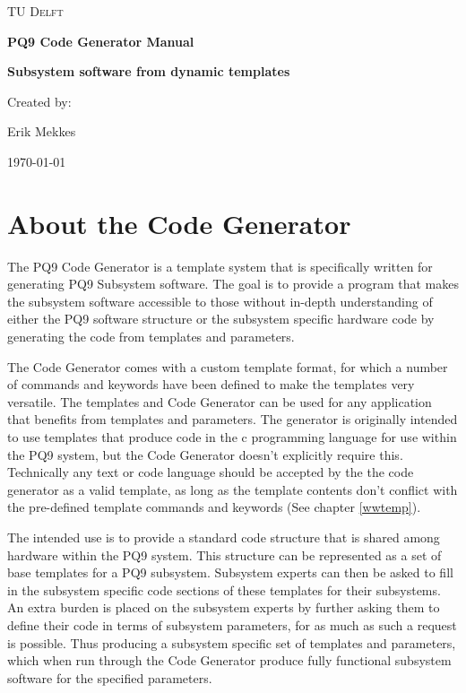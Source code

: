\documentclass{settings/TU_Delft_Report}
\begin{document}
\begin{titlepage}
	\centering
	{\scshape\LARGE TU Delft \par}
	\vspace{1cm}
	{\huge\bfseries PQ9 Code Generator Manual\par}
	{\Large\bfseries Subsystem software from dynamic templates \par}

	\vfill  %
	{Created by: \par
	    Erik Mekkes}
	
	\vspace{0.3cm}
	
	{\large \today\par} %
\end{titlepage}

\tableofcontents


\chapter{About the Code Generator}
The PQ9 Code Generator is a template system that is specifically written for generating PQ9 Subsystem software. The goal is to provide a program that makes the subsystem software accessible to those without in-depth understanding of either the PQ9 software structure or the subsystem specific hardware code by generating the code from templates and parameters. 

\vsp The Code Generator comes with a custom template format, for which a number of commands and keywords have been defined to make the templates very versatile. The templates and Code Generator can be used for any application that benefits from templates and parameters. The generator is originally intended to use templates that produce code in the c programming language for use within the PQ9 system, but the Code Generator doesn't explicitly require this. Technically any text or code language should be accepted by the the code generator as a valid template, as long as the template contents don't conflict with the pre-defined template commands and keywords (See chapter \ref{wwtemp}).

\vsp The intended use is to provide a standard code structure that is shared among hardware within the PQ9 system. This structure can be represented as a set of base templates for a PQ9 subsystem. Subsystem experts can then be asked to fill in the subsystem specific code sections of these templates for their subsystems. An extra burden is placed on the subsystem experts by further asking them to define their code in terms of subsystem parameters, for as much as such a request is possible. Thus producing a subsystem specific set of templates and parameters, which when run through the Code Generator produce fully functional subsystem software for the specified parameters.
\end{document}
